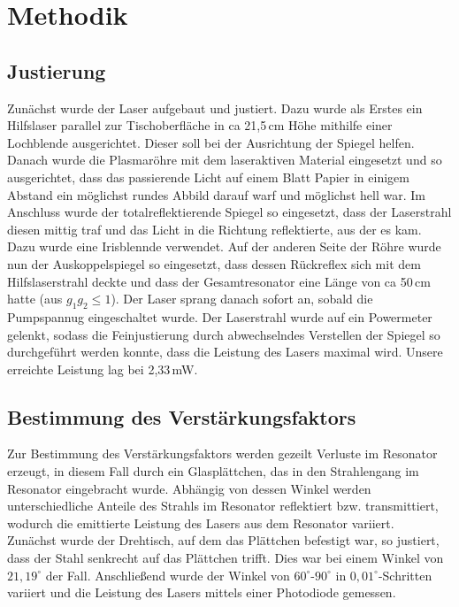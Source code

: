 
\chapter{Methodik}


\section{Justierung}
Zunächst wurde der Laser aufgebaut und justiert. Dazu wurde als Erstes ein Hilfslaser parallel zur Tischoberfläche in ca 21,5\,cm Höhe mithilfe einer Lochblende ausgerichtet. Dieser soll bei der Ausrichtung der Spiegel helfen. 
Danach wurde die Plasmaröhre mit dem laseraktiven Material eingesetzt und so ausgerichtet, dass das passierende Licht auf einem Blatt Papier in einigem Abstand ein möglichst rundes Abbild darauf warf und möglichst hell war. 
Im Anschluss wurde der totalreflektierende Spiegel so eingesetzt, dass der Laserstrahl diesen mittig traf und das Licht in die Richtung reflektierte, aus der es kam. Dazu wurde eine Irisblennde verwendet. 
Auf der anderen Seite der Röhre wurde nun der Auskoppelspiegel so eingesetzt, dass dessen Rückreflex sich mit dem Hilfslaserstrahl deckte und dass der Gesamtresonator eine Länge von ca 50\,cm hatte (aus $g_1g_2\leq 1$). 
Der Laser sprang danach sofort an, sobald die Pumpspannug eingeschaltet wurde. 
Der Laserstrahl wurde auf ein Powermeter gelenkt, sodass die Feinjustierung durch abwechselndes Verstellen der Spiegel so durchgeführt werden konnte, dass die Leistung des Lasers maximal wird. Unsere erreichte Leistung lag bei 2,33\,mW. 

\section{Bestimmung des Verstärkungsfaktors}
Zur Bestimmung des Verstärkungsfaktors werden gezeilt Verluste im Resonator erzeugt, in diesem Fall durch ein Glasplättchen, das in den Strahlengang im Resonator eingebracht 
wurde. Abhängig von dessen Winkel werden unterschiedliche Anteile des Strahls im Resonator reflektiert bzw. transmittiert, wodurch die emittierte Leistung des Lasers aus dem 
Resonator variiert. \\
Zunächst wurde der Drehtisch, auf dem das Plättchen befestigt war, so justiert, dass der Stahl senkrecht auf das Plättchen trifft. Dies war bei einem Winkel von $21,19^{\circ}$ der 
Fall. Anschließend wurde der Winkel von $60^{\circ}$-$90^{\circ}$ in $0,01^{\circ}$-Schritten variiert und die Leistung des Lasers mittels einer Photodiode gemessen.


